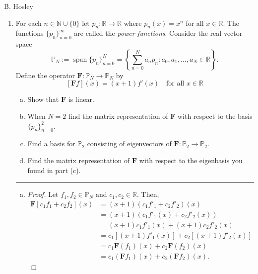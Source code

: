 \documentclass[12pt]{amsart}
\newcommand{\1}{\mathbbm{1}}
\numberwithin{equation}{section}
\numberwithin{Theorem}{section}
\theoremstyle{plain} %
\theoremstyle{definition}
\theoremstyle{remark}
\begin{document}
\thispagestyle{empty}

\hspace{\fill} {\Large B. Hosley}
\bigskip

\begin{enumerate}[1.]

\item For each \(n\in\mathbb{N}\cup\{0\}\) let \(p_{n}:\mathbb{R}\to\mathbb{R}\) where \(p_{n}(x) = x^{n}\) for all \(x\in\mathbb{R}\). The functions \(\{p_{n}\}_{n=0}^{\infty}\) are called the \textit{power functions}. Consider the real vector space 
\[\mathbb{P}_{N}:=\operatorname{span}\{p_{n}\}_{n=0}^{N} = \left\{\sum_{n=0}^{N}a_{n}p_{n} : a_{0},a_{1},\ldots,a_{N}\in\mathbb{R}\right\}.\]
Define the operator \(\mathbf{F}:\mathbb{P}_{N}\to\mathbb{P}_{N}\) by \[[\mathbf{F}f](x) = (x+1)f'(x)\quad\text{for all }x\in\mathbb{R}\]

\medskip

\begin{enumerate}[(a)]

\item Show that \(\mathbf{F}\) is linear.\medskip

\item When \(N=2\) find the matrix representation of \(\mathbf{F}\) with respect to the basis \(\{p_{n}\}_{n=0}^{2}\).\medskip

\item Find a basis for \(\mathbb{P}_{2}\) consisting of eigenvectors of \(\mathbf{F}:\mathbb{P}_{2}\to\mathbb{P}_{2}\).\medskip

\item Find the matrix representation of \(\mathbf{F}\) with respect to the eigenbasis you found in part (c).\medskip

\end{enumerate}

\bigskip
\hrule
\bigskip
\begin{enumerate}[(a)]
	\item %
	\begin{proof}
		Let \(f_1,f_2\in\mathbb{P}_N\) and \(c_1,c_2\in\mathbb{R}\).
		Then,
		\begin{align*}
			\mathbf{F}[c_1f_1+c_2f_2](x)
			&= (x+1)(c_1f'_1+c_2f'_2)(x) \\
			&= (x+1)(c_1f'_1(x)+c_2f'_2(x)) \\
			&= (x+1)c_1f'_1(x)+(x+1)c_2f'_2(x) \\
			&= c_1[(x+1)f'_1(x)]+c_2[(x+1)f'_2(x)] \\
			&= c_1\mathbf{F}(f_1)(x)+c_2\mathbf{F}(f_2)(x) \\
			&= c_1(\mathbf{F}f_1)(x)+c_2(\mathbf{F}f_2)(x).
		\end{align*}
	\end{proof} \bigskip


\end{enumerate}
\end{enumerate}
\end{document}
